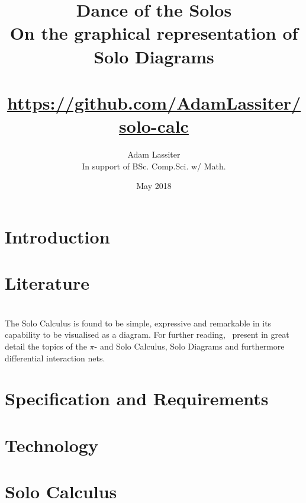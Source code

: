 \documentclass[twoside]{article}
\title{Dance of the Solos \\
    \large On the graphical representation of Solo Diagrams \\~\\
    \small \url{https://github.com/AdamLassiter/solo-calc}}
\author{Adam Lassiter \\
    \small In support of BSc. Comp.Sci. w/ Math.}
\date{May 2018}
\begin{document}
    
    
    \pagebreak

    
    \pagebreak

    
    \pagebreak

    

    
    \pagebreak

    
    \pagebreak

    \tableofcontents
    \pagebreak

    \section{Introduction}
        

    \section{Literature}
        
        
        
        
        
        
        ~\\ %
        The Solo Calculus is found to be simple, expressive and remarkable in its capability to be visualised as a diagram.
        For further reading,~\cite{acyclic-solos} present in great detail the topics of the $\pi$- and Solo Calculus, Solo Diagrams and furthermore differential interaction nets.

    \section{Specification and Requirements}
        
        

    \section{Technology}

    \section{Solo Calculus}
        
        
\end{document}
